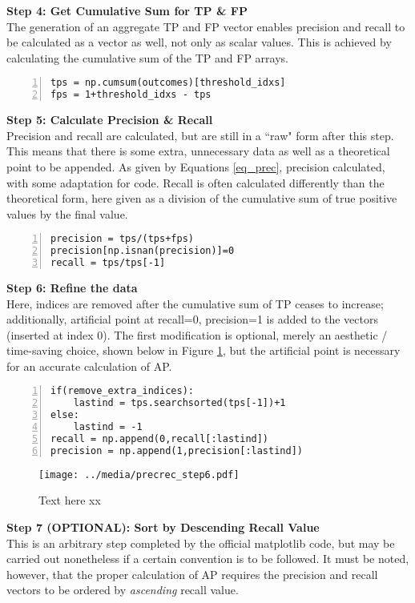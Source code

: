 \textbf{{\large Step 4: Get Cumulative Sum for TP \& FP }} \\
The generation of an aggregate TP and FP vector enables precision and recall to be calculated as a vector as well, not only as scalar values. This is achieved by calculating the cumulative sum of the TP and FP arrays.
\begin{lstlisting}[numbers=left]
tps = np.cumsum(outcomes)[threshold_idxs]
fps = 1+threshold_idxs - tps
\end{lstlisting}


\textbf{{\large Step 5: Calculate Precision \& Recall}} \\
Precision and recall are calculated, but are still in a ``raw" form after this step. This means that there is some extra, unnecessary data as well as a theoretical point to be appended. As given by Equations \ref{eq_prec}, precision calculated, with some adaptation for code. Recall is often calculated differently than the theoretical form, here given as a division of the cumulative sum of true positive values by the final value.

\begin{lstlisting}[numbers=left]
precision = tps/(tps+fps)
precision[np.isnan(precision)]=0
recall = tps/tps[-1]
\end{lstlisting}


\textbf{{\large Step 6: Refine the data}} \\
Here, indices are removed after the cumulative sum of TP ceases to increase; additionally, artificial point at recall=0, precision=1 is added to the vectors (inserted at index 0). The first modification is optional, merely an aesthetic / time-saving choice, shown below in Figure \ref{precrec_step6}, but the artificial point is necessary for an accurate calculation of AP.

\begin{lstlisting}[numbers=left]
if(remove_extra_indices):
    lastind = tps.searchsorted(tps[-1])+1
else:
    lastind = -1
recall = np.append(0,recall[:lastind])
precision = np.append(1,precision[:lastind])
\end{lstlisting}

\begin{figure}[ht]
    \centering
    \texttt{[image: ../media/precrec\_step6.pdf]}
    \caption{Text here xx}
    \label{precrec_step6}
\end{figure}

\textbf{{\large Step 7 (OPTIONAL): Sort by Descending Recall Value}} \\
This is an arbitrary step completed by the official matplotlib code, but may be carried out nonetheless if a certain convention is to be followed. It must be noted, however, that the proper calculation of AP requires the precision and recall vectors to be ordered by \textit{ascending} recall value.

